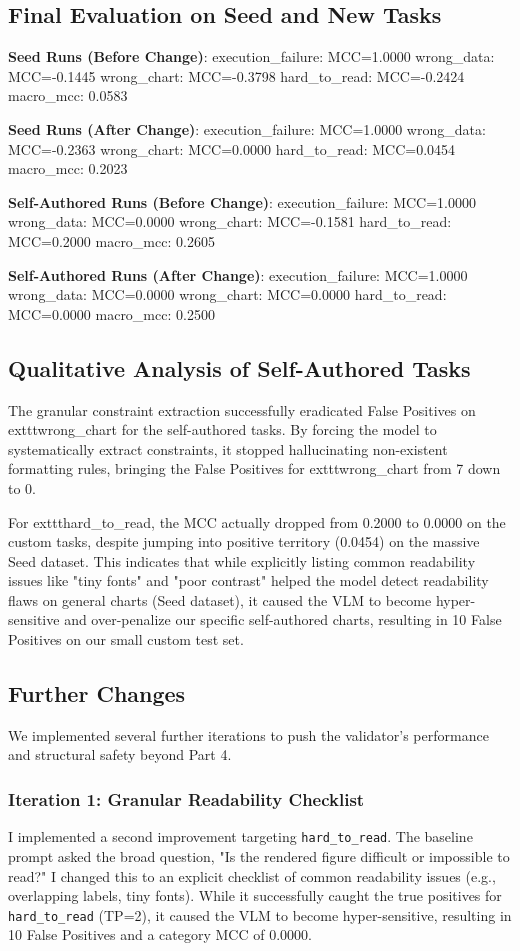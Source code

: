 \documentclass[11pt]{article}
\begin{document}
\subsection{Final Evaluation on Seed and New Tasks}
\textbf{Seed Runs (Before Change)}:
execution\_failure: MCC=1.0000
wrong\_data: MCC=-0.1445
wrong\_chart: MCC=-0.3798
hard\_to\_read: MCC=-0.2424
macro\_mcc: 0.0583

\textbf{Seed Runs (After Change)}:
execution\_failure: MCC=1.0000
wrong\_data: MCC=-0.2363
wrong\_chart: MCC=0.0000
hard\_to\_read: MCC=0.0454
macro\_mcc: 0.2023

\textbf{Self-Authored Runs (Before Change)}:
execution\_failure: MCC=1.0000
wrong\_data: MCC=0.0000
wrong\_chart: MCC=-0.1581
hard\_to\_read: MCC=0.2000
macro\_mcc: 0.2605

\textbf{Self-Authored Runs (After Change)}:
execution\_failure: MCC=1.0000
wrong\_data: MCC=0.0000
wrong\_chart: MCC=0.0000
hard\_to\_read: MCC=0.0000
macro\_mcc: 0.2500

\subsection{Qualitative Analysis of Self-Authored Tasks}
The granular constraint extraction successfully eradicated False Positives on 	exttt{wrong\_chart} for the self-authored tasks. By forcing the model to systematically extract constraints, it stopped hallucinating non-existent formatting rules, bringing the False Positives for 	exttt{wrong\_chart} from 7 down to 0. 

For 	exttt{hard\_to\_read}, the MCC actually dropped from 0.2000 to 0.0000 on the custom tasks, despite jumping into positive territory (0.0454) on the massive Seed dataset. This indicates that while explicitly listing common readability issues like "tiny fonts" and "poor contrast" helped the model detect readability flaws on general charts (Seed dataset), it caused the VLM to become hyper-sensitive and over-penalize our specific self-authored charts, resulting in 10 False Positives on our small custom test set. 

\subsection{Further Changes}
We implemented several further iterations to push the validator's performance and structural safety beyond Part 4.

\subsubsection*{Iteration 1: Granular Readability Checklist}
I implemented a second improvement targeting \texttt{hard\_to\_read}. The baseline prompt asked the broad question, "Is the rendered figure difficult or impossible to read?" I changed this to an explicit checklist of common readability issues (e.g., overlapping labels, tiny fonts). While it successfully caught the true positives for \texttt{hard\_to\_read} (TP=2), it caused the VLM to become hyper-sensitive, resulting in 10 False Positives and a category MCC of 0.0000. 
\end{document}
